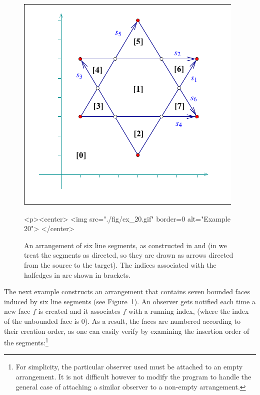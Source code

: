 \begin{figure}[!htp]
\begin{ccTexOnly}
  \begin{center}
  \includegraphics{Arrangement_2/fig/ex_20}
  \end{center}
\end{ccTexOnly}
\begin{ccHtmlOnly}
  <p><center>
  <img src="./fig/ex_20.gif" border=0 alt="Example 20">
  </center>
\end{ccHtmlOnly}
\caption{An arrangement of six line segments, as constructed in
 and 
(in  we treat
the segments as directed, so they are drawn as arrows directed from the
source to the target). The indices associated with the halfedges in
 are shown in brackets.}
\label{arr_fig:ex_20}
\end{figure}

The next example constructs an arrangement that contains seven bounded 
faces induced by six line segments (see Figure~\ref{arr_fig:ex_20}). An 
observer gets notified each time a new face $f$ is created and it associates 
$f$ with a running index, (where the index of the unbounded face
is 0). As a result, the faces are numbered according to their creation
order, as one can easily verify by examining the insertion order of the
segments:\footnote{For simplicity, the particular observer used must be
attached to an empty arrangement. It is not difficult however to modify 
the program to handle the general case of attaching a similar observer
to a non-empty arrangement.}

